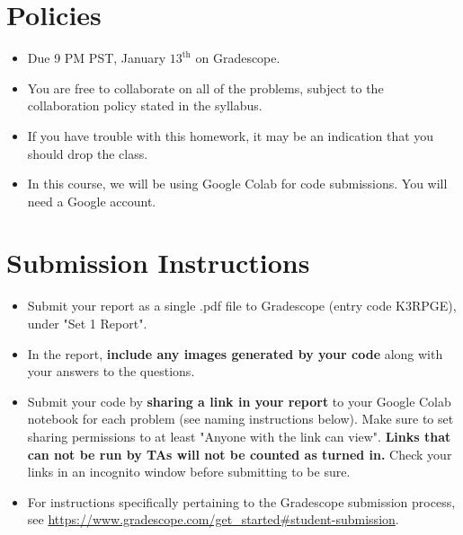 \newif\ifshowsolutions
\showsolutionstrue





\pagestyle{fancy}




\section*{Policies}
\begin{itemize}
  \item Due 9 PM PST, January $13^\text{th}$ on Gradescope. 
  \item You are free to collaborate on all of the problems, subject to the collaboration policy stated in the syllabus.
  \item If you have trouble with this homework, it may be an indication that you should drop the class.
  \item In this course, we will be using Google Colab for code submissions. You will need a Google account.
\end{itemize}

\section*{Submission Instructions}

\begin{itemize}
  \item Submit your report as a single .pdf file to Gradescope (entry code K3RPGE), under "Set 1 Report". 
  \item In the report, \textbf{include any images generated by your code} along with your answers to the questions.
  \item Submit your code by \textbf{sharing a link in your report} to your Google Colab notebook for each problem (see naming instructions below). Make sure to set sharing permissions to at least "Anyone with the link can view". \textbf{Links that can not be run by TAs will not be counted as turned in.} Check your links in an incognito window before submitting to be sure. 
  \item For instructions specifically pertaining to the Gradescope submission process, see \url{https://www.gradescope.com/get_started#student-submission}.
\end{itemize}



